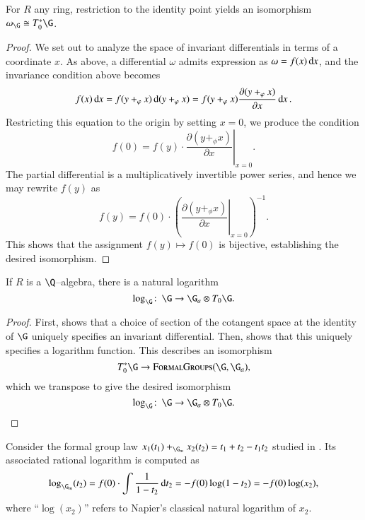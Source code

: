 \begin{lemma}\label{InvDifflsAreDeterminedByConstantTerm}
For $R$ any ring, restriction to the identity point yields an isomorphism $\omega_{\G} \cong T_0^* \G$.
\end{lemma}
\begin{proof}
We set out to analyze the space of invariant differentials in terms of a coordinate $x$.  As above, a differential $\omega$ admits expression as $\omega = f(x) \operatorname{d\mathit{x}}$, and the invariance condition above becomes \[f(x) \operatorname{d\mathit{x}} = f(y +_\varphi x) \operatorname{d}(y +_\varphi x) = f(y +_\varphi x) \frac{\partial(y +_\varphi x)}{\partial x} \operatorname{d\mathit{x}}.\]  Restricting this equation to the origin by setting $x = 0$, we produce the condition \[f(0) = f(y) \cdot \left. \frac{\partial(y +_\phi x)}{\partial x} \right|_{x=0}.\]  The partial differential is a multiplicatively invertible power series, and hence we may rewrite $f(y)$ as \[f(y) = f(0) \cdot \left(\left. \frac{\partial(y +_\phi x)}{\partial x} \right|_{x=0}\right)^{-1}.\]  This shows that the assignment $f(y) \mapsto f(0)$ is bijective, establishing the desired isomorphism.
\end{proof}

\begin{theorem}\label{RationalFGLsHaveLogarithms}
If $R$ is a $\Q$--algebra, there is a natural logarithm \[\log_{\G}\co \G \to \G_a \otimes T_0 \G.\]
\end{theorem}
\begin{proof}
First,  shows that a choice of section of the cotangent space at the identity of $\G$ uniquely specifies an invariant differential.  Then,  shows that this uniquely specifies a logarithm function.  This describes an isomorphism \[T_0^* \G \to \CatOf{FormalGroups}(\G, \G_a),\] which we transpose to give the desired isomorphism \[\log_{\G}\co \G \to \G_a \otimes T_0 \G. \qedhere\]
\end{proof}

\begin{example}\label{GmAndItsLogExample}
Consider the formal group law $x_1(t_1) +_{\G_m} x_2(t_2) = t_1 + t_2 - t_1 t_2$ studied in .  Its associated rational logarithm is computed as \[\log_{\G_m}(t_2) = f(0) \cdot \int \frac{1}{1 - t_2} \operatorname{d\mathit{t}_2} = -f(0) \log(1 - t_2) = -f(0) \log(x_2),\] where ``$\log(x_2)$'' refers to Napier's classical natural logarithm of $x_2$.
\end{example}









